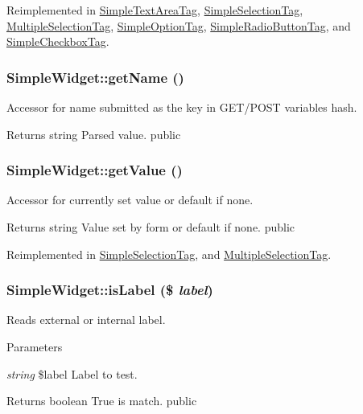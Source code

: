 Reimplemented in \hyperlink{class_simple_text_area_tag_af6b231753b32277ea079a1c55355a27a}{SimpleTextAreaTag}, \hyperlink{class_simple_selection_tag_ab515be0efa0968f8e74f3ed2312b3463}{SimpleSelectionTag}, \hyperlink{class_multiple_selection_tag_a3fa45878dee4cde402bc5a36dc3b3a80}{MultipleSelectionTag}, \hyperlink{class_simple_option_tag_a2dd51cf14536d7f852f2976fa8bc96c4}{SimpleOptionTag}, \hyperlink{class_simple_radio_button_tag_ac6c12af9e40ad20addeecb398e92f95d}{SimpleRadioButtonTag}, and \hyperlink{class_simple_checkbox_tag_a7d35adf28b5e7e0b891464e47ac1a6bc}{SimpleCheckboxTag}.\hypertarget{class_simple_widget_a843805d75f3035c202d169b343005828}{
\subsubsection[{getName}]{\setlength{\rightskip}{0pt plus 5cm}SimpleWidget::getName ()}}
\label{class_simple_widget_a843805d75f3035c202d169b343005828}
Accessor for name submitted as the key in GET/POST variables hash. \begin{DoxyReturn}{Returns}
string Parsed value.  public 
\end{DoxyReturn}
\hypertarget{class_simple_widget_a92328cffb96f6966d6a6a07827e65f6d}{
\subsubsection[{getValue}]{\setlength{\rightskip}{0pt plus 5cm}SimpleWidget::getValue ()}}
\label{class_simple_widget_a92328cffb96f6966d6a6a07827e65f6d}
Accessor for currently set value or default if none. \begin{DoxyReturn}{Returns}
string Value set by form or default if none.  public 
\end{DoxyReturn}


Reimplemented in \hyperlink{class_simple_selection_tag_a2eb746b2b426205f78ff4eecf6f335a0}{SimpleSelectionTag}, and \hyperlink{class_multiple_selection_tag_a4a3e75f773c42108d27fdc5c73cb0d55}{MultipleSelectionTag}.\hypertarget{class_simple_widget_ab4560f7a1b68df77c3ee34f6bc81dcab}{
\subsubsection[{isLabel}]{\setlength{\rightskip}{0pt plus 5cm}SimpleWidget::isLabel (\$ {\em label})}}
\label{class_simple_widget_ab4560f7a1b68df77c3ee34f6bc81dcab}
Reads external or internal label. 
\begin{DoxyParams}{Parameters}
\item[{\em string}]\$label Label to test. \end{DoxyParams}
\begin{DoxyReturn}{Returns}
boolean True is match.  public 
\end{DoxyReturn}


